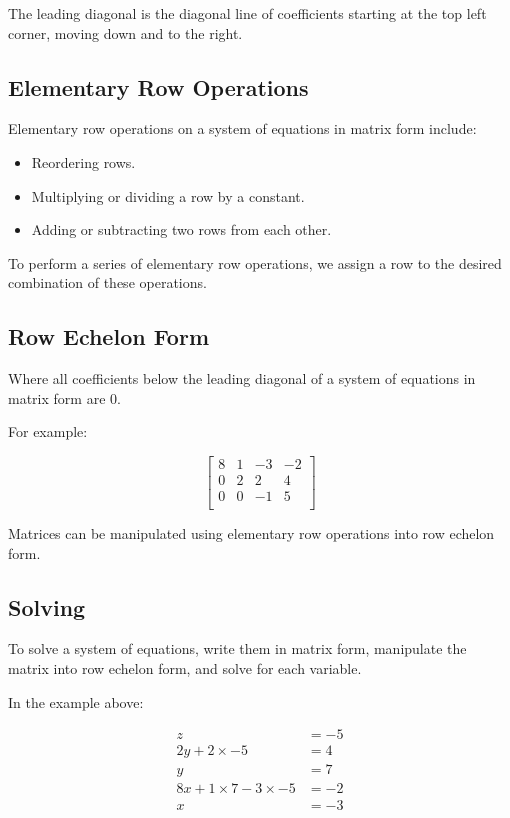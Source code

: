 \documentclass[a4paper,11pt]{article}
\begin{document}
The leading diagonal is the diagonal line of coefficients starting at the top
left corner, moving down and to the right.


\subsection{Elementary Row Operations}

Elementary row operations on a system of equations in matrix form include:

\begin{itemize}
\item Reordering rows.
\item Multiplying or dividing a row by a constant.
\item Adding or subtracting two rows from each other.
\end{itemize}

To perform a series of elementary row operations, we assign a row to the desired
combination of these operations.


\subsection{Row Echelon Form}

Where all coefficients below the leading diagonal of a system of equations in
matrix form are 0.

For example:

$$
\begin{bmatrix}
8 & 1 & -3 & -2 \\
0 & 2 &  2 &  4 \\
0 & 0 & -1 &  5 \\
\end{bmatrix}
$$

Matrices can be manipulated using elementary row operations into row echelon
form.


\subsection{Solving}

To solve a system of equations, write them in matrix form, manipulate the matrix
into row echelon form, and solve for each variable.

In the example above:

$$
\begin{aligned}
z & = -5 \\
2y + 2 \times -5 & = 4 \\
y & = 7 \\
8x + 1 \times 7 - 3 \times -5 & = -2 \\
x & = -3 \\
\end{aligned}
$$
\end{document}
